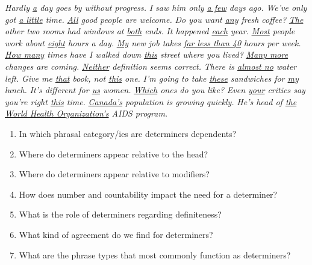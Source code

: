 \ea \label{ex:determiners}
    \ea\textit{Hardly \uline{a} day goes by without progress.}
    \ex\textit{I saw him only \uline{a few} days ago.}
    \ex\textit{We've only got \uline{a little} time.} 
    \ex\textit{\uline{All} good people are welcome.} 
    \ex\textit{Do you want \uline{any} fresh coffee?} 
    \ex\textit{\uline{The} other two rooms had windows at \uline{both} ends.} 
    \ex\textit{It happened \uline{each} year.} 
    \ex\textit{\uline{Most} people work about \uline{eight} hours a day.} 
    \ex\textit{\uline{My} new job takes \uline{far less than 40} hours per week.} 
    \ex\textit{\uline{How many} times have I walked down \uline{this} street where you lived?} 
    \ex\textit{\uline{Many more} changes are coming.} 
    \ex\textit{\uline{Neither} definition seems correct.} 
    \ex\textit{There is \uline{almost no} water left.} 
    \ex\textit{Give me \uline{that} book, not \uline{this} one.} 
    \ex\textit{I'm going to take \uline{these} sandwiches for \uline{my} lunch.} 
    \ex\textit{It's different for \uline{us} women.} 
    \ex\textit{\uline{Which} ones do you like?} 
    \ex\textit{Even \uline{your} critics say you're right \uline{this} time.}
    \ex\textit{\uline{Canada's} population is growing quickly.} 
    \ex\textit{He's head of \uline{the World Health Organization's} AIDS program.}
    \z
\z

\begin{enumerate}[noitemsep]
    \item In which phrasal category/ies are determiners dependents?
    \item Where do determiners appear relative to the head?
    \item Where do determiners appear relative to modifiers?
    \item How does number and countability impact the need for a determiner?
    \item What is the role of determiners regarding definiteness?
    \item What kind of agreement do we find for determiners?
    \item What are the phrase types that most commonly function as determiners?
\end{enumerate}

